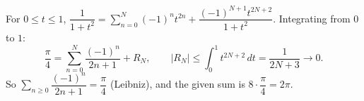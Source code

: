 For $0\le t\le1$, $\dfrac1{1+t^2}=\sum_{n=0}^{N}(-1)^nt^{2n}+\dfrac{(-1)^{N+1}t^{2N+2}}{1+t^2}$. Integrating from $0$ to $1$:
\[\dfrac\pi4=\sum_{n=0}^{N}\dfrac{(-1)^n}{2n+1}+R_N,\qquad|R_N|\le\int_0^1t^{2N+2}\,dt=\dfrac1{2N+3}\to0.\]
So $\sum_{n\ge0}\dfrac{(-1)^n}{2n+1}=\dfrac\pi4$ (Leibniz), and the given sum is $8\cdot\dfrac\pi4=\boxed{2\pi}$.

